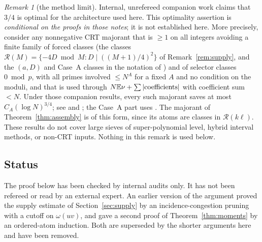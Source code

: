\documentclass[10pt,reqno]{amsart}
\theoremstyle{remark}
\newtheorem{remark}[theorem]{Remark}
\newcommand{\E}{\mathbb E}
\begin{document}
\begin{remark}[the method limit]\label{rem:limit}
Internal, unrefereed companion work \cite{KA3,SL} claims that $3/4$ is
optimal for the architecture used here.  This optimality assertion is
\emph{conditional on the proofs in those notes}; it is not established
here.  More precisely, consider any
nonnegative CRT majorant that is $\geq1$ on all integers avoiding a finite
family of forced classes (the classes
$\mathcal R(M)=\{-4D\bmod M:D\mid((M+1)/4)^2\}$ of
Remark~\ref{rem:supply}, and the $(a,D)$ and Case~A classes in the
notation of \cite{KA3}) and of selector classes $0\bmod p$, with all
primes involved $\leq N^{A}$ for a fixed $A$ and no condition on the
moduli, and that is used through $N\E\nu+\sum|{\rm coefficients}|$ with
coefficient sum $<N$.  Under those companion results, every such majorant
saves at most $C_A(\log N)^{3/4}$; see \cite[Cor.~4.2]{KA3} and
\cite[Thm.~10.14]{SL}; the Case~A part uses \cite[Prop.~1.4, \S7]{ET}.
The majorant of Theorem~\ref{thm:assembly} is of this form, since its
atoms are classes in $\mathcal R(k\ell)$.  These results do not cover large sieves of super-polynomial
level, hybrid interval methods, or non-CRT inputs.  Nothing in this remark
is used below.
\end{remark}

\subsection*{Status}
The proof below has been checked by internal audits only.  It has not been
refereed or read by an external expert.  An earlier version of the
argument proved the supply estimate of Section~\ref{sec:supply} by an
incidence-congestion pruning with a cutoff on $\omega(uv)$, and gave a
second proof of Theorem~\ref{thm:moments} by an ordered-atom induction.
Both are superseded by the shorter arguments here and have been removed.
\end{document}
